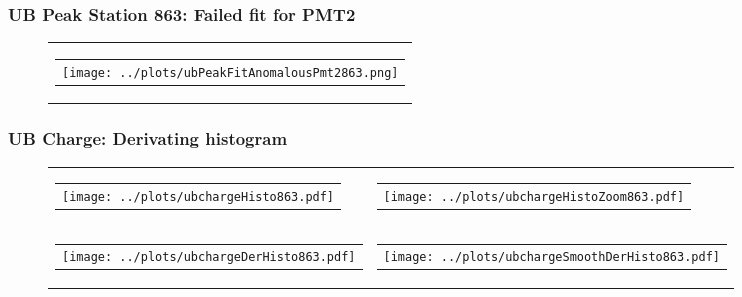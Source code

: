 \documentclass[aspectratio=169]{beamer}
\begin{document}
\begin{frame}
  \frametitle{UB Peak Station 863: Failed fit for PMT2}
  \begin{figure}
    \centering
    \begin{tabularx}{\textwidth}{C}
      \begin{tabular}{l}
        \texttt{[image: ../plots/ubPeakFitAnomalousPmt2863.png]}
      \end{tabular}
    \end{tabularx}
  \end{figure}
\end{frame}



\begin{frame}
  \frametitle{UB Charge: Derivating histogram} %
  \begin{figure}
    \centering
    \begin{tabularx}{\textwidth}{CC}
      \begin{tabular}{l}
        \texttt{[image: ../plots/ubchargeHisto863.pdf]}
      \end{tabular}
      &
      \begin{tabular}{l}
        \texttt{[image: ../plots/ubchargeHistoZoom863.pdf]}
      \end{tabular}
      \\
      \begin{tabular}{l}
        \texttt{[image: ../plots/ubchargeDerHisto863.pdf]}
      \end{tabular}
      &
      \begin{tabular}{l}
        \texttt{[image: ../plots/ubchargeSmoothDerHisto863.pdf]}
      \end{tabular}
    \end{tabularx}
  \end{figure}
\end{frame}
\end{document}

